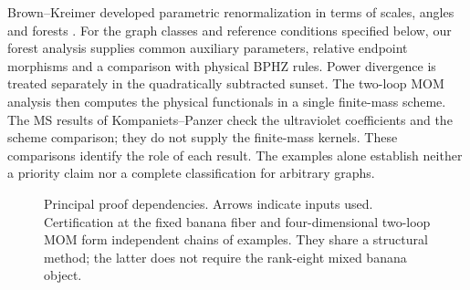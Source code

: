 \documentclass[11pt,a4paper,oneside]{article}
\theoremstyle{plain}
\theoremstyle{definition}
\theoremstyle{remark}
\numberwithin{equation}{section}
\begin{document}
Brown--Kreimer developed parametric renormalization in terms of scales, angles and forests \cite{bk2011,bk2012}. For the graph classes and reference conditions specified below, our forest analysis supplies common auxiliary parameters, relative endpoint morphisms and a comparison with physical BPHZ rules. Power divergence is treated separately in the quadratically subtracted sunset. The two-loop MOM analysis then computes the physical functionals in a single finite-mass scheme. The MS results of Kompaniets--Panzer check the ultraviolet coefficients and the scheme comparison; they do not supply the finite-mass kernels\cite{kp}. These comparisons identify the role of each result. The examples alone establish neither a priority claim nor a complete classification for arbitrary graphs.

\begin{figure}[ht]
\centering
{}
\caption{Principal proof dependencies. Arrows indicate inputs used. Certification at the fixed banana fiber and four-dimensional two-loop MOM form independent chains of examples. They share a structural method; the latter does not require the rank-eight mixed banana object.}
\label{fig:dependencies}
\end{figure}
\end{document}
